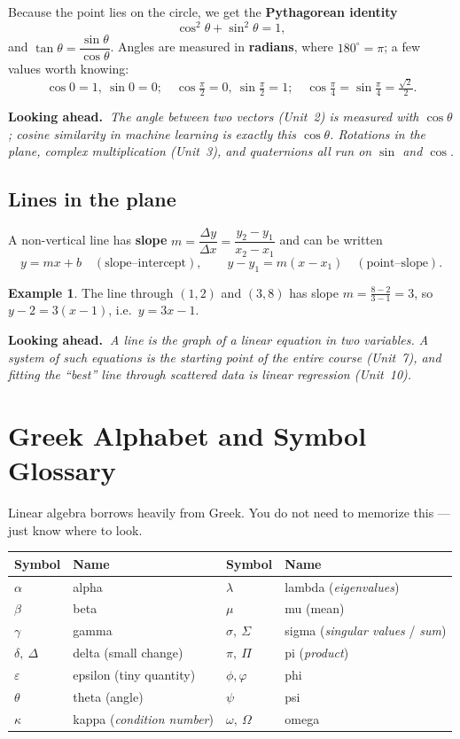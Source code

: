 \documentclass[11pt]{article}
\theoremstyle{definition}
\newtheorem{example}{Example}[section]
\newcommand{\lookahead}[1]{%
  \par\smallskip\noindent
  {\sffamily\bfseries\color{BrickRed}Looking ahead.~}\textit{#1}\par\smallskip}
\begin{document}
Because the point lies on the circle, we get the \textbf{Pythagorean identity}
\[
\cos^2\theta+\sin^2\theta=1,
\]
and $\tan\theta=\dfrac{\sin\theta}{\cos\theta}$. Angles are measured in
\textbf{radians}, where $180^\circ=\pi$; a few values worth knowing:
\[
\cos 0=1,\ \sin 0=0;\quad \cos\tfrac{\pi}{2}=0,\ \sin\tfrac{\pi}{2}=1;\quad
\cos\tfrac{\pi}{4}=\sin\tfrac{\pi}{4}=\tfrac{\sqrt2}{2}.
\]

\lookahead{The angle between two vectors (Unit~2) is measured with $\cos\theta$;
cosine \emph{similarity} in machine learning is exactly this $\cos\theta$.
Rotations in the plane, complex multiplication (Unit~3), and quaternions all run
on $\sin$ and $\cos$.}

\subsection{Lines in the plane}
A non-vertical line has \textbf{slope} $m=\dfrac{\Delta y}{\Delta x}=\dfrac{y_2-y_1}{x_2-x_1}$
and can be written
\[
y=mx+b \quad(\text{slope--intercept}),\qquad
y-y_1=m(x-x_1)\quad(\text{point--slope}).
\]

\begin{example}
The line through $(1,2)$ and $(3,8)$ has slope $m=\frac{8-2}{3-1}=3$, so
$y-2=3(x-1)$, i.e.\ $y=3x-1$.
\end{example}

\lookahead{A line is the graph of a \emph{linear} equation in two variables. A
\emph{system} of such equations is the starting point of the entire course
(Unit~7), and fitting the ``best'' line through scattered data is linear
regression (Unit~10).}

\section{Greek Alphabet and Symbol Glossary}
Linear algebra borrows heavily from Greek. You do not need to memorize this ---
just know where to look.

\begin{center}
\renewcommand{\arraystretch}{1.2}
\begin{tabular}{@{}llll@{}}
\toprule
\textbf{Symbol} & \textbf{Name} & \textbf{Symbol} & \textbf{Name}\\
\midrule
$\alpha$ & alpha & $\lambda$ & lambda (\emph{eigenvalues})\\
$\beta$ & beta & $\mu$ & mu (mean)\\
$\gamma$ & gamma & $\sigma,\ \Sigma$ & sigma (\emph{singular values} / \emph{sum})\\
$\delta,\ \Delta$ & delta (small change) & $\pi,\ \Pi$ & pi (\emph{product})\\
$\varepsilon$ & epsilon (tiny quantity) & $\phi,\varphi$ & phi\\
$\theta$ & theta (angle) & $\psi$ & psi\\
$\kappa$ & kappa (\emph{condition number}) & $\omega,\ \Omega$ & omega\\
\bottomrule
\end{tabular}
\end{center}
\end{document}
